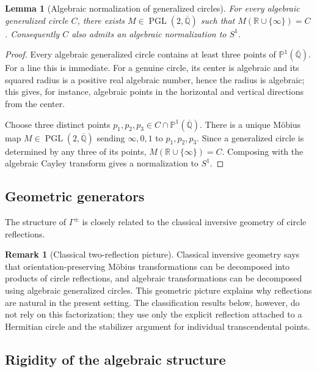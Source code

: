 \documentclass[11pt,a4paper]{article}
\theoremstyle{plain}
\newtheorem{lemma}[theorem]{Lemma}
\theoremstyle{definition}
\newtheorem{remark}[theorem]{Remark}
\newcommand{\R}{\mathbb{R}}
\newcommand{\Alg}{\overline{\mathbb{Q}}}
\newcommand{\PAlg}{\mathbb{P}^{1}(\Alg)}
\DeclareMathOperator{\PGL}{PGL}
\begin{document}
\begin{lemma}[Algebraic normalization of generalized circles]\label{lem:circle-normalization}
	For every algebraic generalized circle $C$, there exists $M\in\PGL(2,\Alg)$ such that $M(\R\cup\{\infty\})=C$. Consequently $C$ also admits an algebraic normalization to $S^1$.
\end{lemma}
\begin{proof}
	Every algebraic generalized circle contains at least three points of $\PAlg$. For a line this is immediate. For a genuine circle, its center is algebraic and its squared radius is a positive real algebraic number, hence the radius is algebraic; this gives, for instance, algebraic points in the horizontal and vertical directions from the center.
	
	Choose three distinct points $p_1,p_2,p_3\in C\cap\PAlg$. There is a unique Möbius map $M\in\PGL(2,\Alg)$ sending $\infty,0,1$ to $p_1,p_2,p_3$. Since a generalized circle is determined by any three of its points, $M(\R\cup\{\infty\})=C$. Composing with the algebraic Cayley transform gives a normalization to $S^1$.
\end{proof}

\subsection{Geometric generators}\label{subsec:inversive-input}

The structure of $\Gamma^{\pm}$ is closely related to the classical inversive geometry of circle reflections.

\begin{remark}[Classical two-reflection picture]\label{rem:two-reflections}
	Classical inversive geometry says that orientation-preserving Möbius transformations can be decomposed into products of circle reflections, and algebraic transformations can be decomposed using algebraic generalized circles. This geometric picture explains why reflections are natural in the present setting. The classification results below, however, do not rely on this factorization; they use only the explicit reflection attached to a Hermitian circle and the stabilizer argument for individual transcendental points.
\end{remark}

\subsection{Rigidity of the algebraic structure}\label{subsec:max-transfer}
\end{document}
